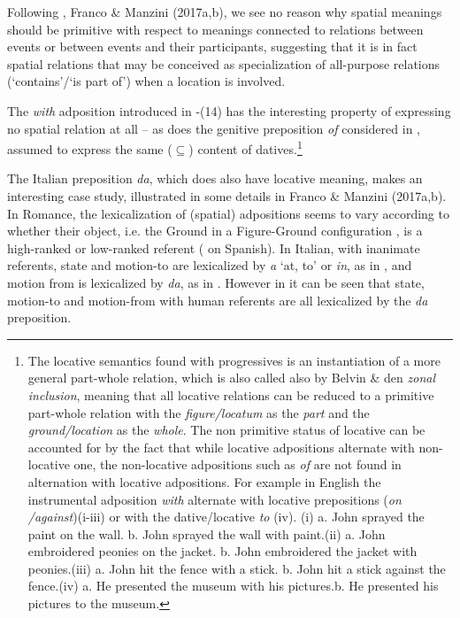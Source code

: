 \documentclass[output=paper]{langsci/langscibook}
\begin{document}
Following \citet{ManziniSavoia2011}, Franco \& Manzini (2017a,b), we see no reason why spatial meanings should be primitive with respect to meanings connected to relations between events or between events and their participants, suggesting that it is in fact spatial relations that may be conceived as specialization of all-purpose relations (‘contains’/‘is part of’) when a location is involved. 

The \textit{with} adposition introduced in -(14) has the interesting property of expressing no spatial relation at all \citep{Levinson2011} – as does the genitive preposition \textit{of} considered in , assumed to express the same (${\subseteq}$) content of datives.\footnote{The locative semantics found with progressives is an instantiation of a more general part-whole relation, which is also called also by Belvin \& den \citet[170]{Dikken1997} \textit{zonal} \textit{inclusion}, meaning that all locative relations can be reduced to a primitive part-whole relation with the \textit{figure/locatum} as the \textit{part} and the \textit{ground/location} as the \textit{whole}. The non primitive status of locative can be accounted for by the fact that while locative adpositions alternate with non-locative one, the non-locative adpositions such as \textit{of} are not found in alternation with locative adpositions. For example in English the instrumental adposition \textit{with} alternate with locative prepositions (\textit{on} \textit{/against})(i-iii) or with the dative/locative \textit{to} (iv). (i) a.   John sprayed the paint on the wall. b.   John sprayed the wall with paint.(ii)   a.   John embroidered peonies on the jacket. b.   John embroidered the jacket with peonies.(iii)  a.   John hit the fence with a stick. b.   John hit a stick against the fence.(iv)   a.   He presented the museum with his pictures.b.    He presented his pictures to the museum.} 

The Italian preposition \textit{da}, which does also have locative meaning, makes an interesting case study, illustrated in some details in Franco \& Manzini (2017a,b). In Romance, the lexicalization of (spatial) adpositions seems to vary according to whether their object, i.e. the Ground in a Figure-Ground configuration \citep{Svenonius2006}, is a high-ranked or low-ranked referent (\citealt{Fábregas2015} on Spanish). In Italian, with inanimate referents, state and motion-to are lexicalized by \textit{a} ‘at, to’ or \textit{in}, as in , and motion from is lexicalized by \textit{da}, as in . However in  it can be seen that state, motion-to and motion-from with human referents are all lexicalized by the \textit{da} preposition. 
\end{document}
